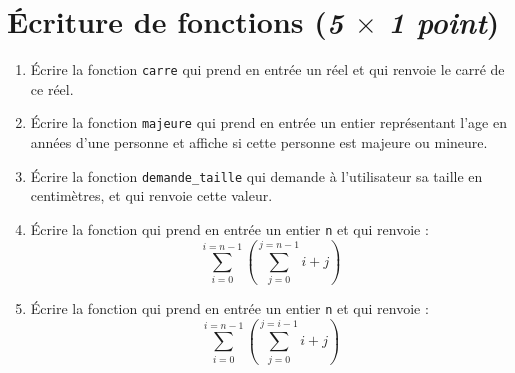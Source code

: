 \section{Écriture de fonctions (\textit{5 $\times$ 1 point})}

\begin{enumerate}
\item Écrire la fonction \verb|carre| qui prend en entrée un réel et qui renvoie le carré de ce réel.
\item Écrire la fonction \verb|majeure| qui prend en entrée un entier représentant l'age en années d'une personne et affiche si cette personne est majeure ou mineure.
\item Écrire la fonction \verb|demande_taille| qui demande à
  l'utilisateur sa taille en centimètres, et qui renvoie cette valeur.
\item Écrire la fonction qui prend en entrée un entier \verb|n| et qui renvoie : \[\sum_{i=0}^{i=n-1} (\sum_{j=0}^{j=n-1}i+j)\]
\item Écrire la fonction qui prend en entrée un entier \verb|n| et qui renvoie : \[\sum_{i=0}^{i=n-1} (\sum_{j=0}^{j=i-1}i+j)\]
\end{enumerate}
